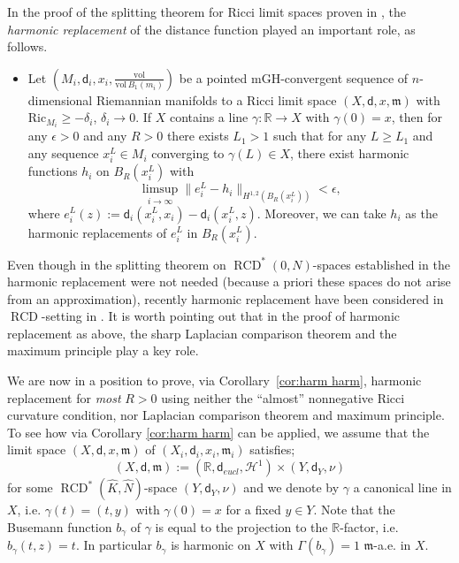 \documentclass[a4paper,11pt,reqno]{article}
\numberwithin{equation}{section}
\theoremstyle{plain}
\theoremstyle{definition}
\theoremstyle{remark}
\newcommand{\dist}{\mathsf{d}}
\newcommand{\meas}{\mathfrak{m}}
\DeclareMathOperator{\RCD}{RCD}
\begin{document}
{\begin{remark}\label{rem:excess}
In the proof of the splitting theorem for Ricci limit spaces proven in \cite{CheegerColding}, the 
\textit{harmonic replacement} of the distance function played an important role, as follows.
\begin{itemize}
\item[] Let $(M_i, \dist_i, x_i,\frac{\mathrm{vol}}{\mathrm{vol}\,B_1(m_i)})$ be a pointed mGH-convergent sequence of $n$-dimensional Riemannian manifolds to a Ricci limit space $(X, \dist,x, \meas)$ with $\mathrm{Ric}_{M_i} \ge -\delta_i$,  $\delta_i \to 0$.
If $X$ contains a line $\gamma: \mathbb{R} \to X$ with $\gamma (0)=x$, then for any $\epsilon>0$ and any $R>0$  there exists 
$L_1>1$ such that for any $L \ge L_1$ and any sequence $x_i^L \in M_i$ converging to $\gamma (L) \in X$,
there exist harmonic functions $h_i$ on $B_R(x^L_i)$ with 
\begin{equation}\label{eq:harm rep ric}
\limsup_{i \to \infty}\|e_i^L-h_i\|_{H^{1, 2}(B_R(x^L_i))}<\epsilon,
\end{equation}
where $e_i^L(z):=\dist_i(x_i^L, x_i)-\dist_i (x_i^L, z)$. Moreover, we can take $h_i$ as the harmonic replacements of $e_i^L$
in $B_R(x_i^L)$.
\end{itemize}

Even though in the splitting theorem on $\RCD^*(0, N)$-spaces established in \cite{Gigli2} the harmonic replacement were not needed
(because a priori these spaces do not arise from an approximation), recently harmonic replacement have been considered in $\RCD$-setting in \cite{HanMondino}. It is worth pointing out that in the proof of harmonic replacement as above, the sharp Laplacian comparison theorem and the 
maximum principle play a key role.

We are now in a position to prove, via Corollary~\ref{cor:harm harm}, harmonic replacement for \textit{most} $R>0$ using neither 
the ``almost'' nonnegative Ricci curvature condition,  nor Laplacian comparison theorem and maximum principle. 
To see how via Corollary \ref{cor:harm harm} can be applied, we assume that the limit space 
$(X, \dist, x,\meas)$ of $(X_i, \dist_i, x_i,\meas_i)$ satisfies;
$$
(X, \dist, \meas) := (\mathbb{R}, \dist_{eucl}, \mathcal{H}^1) \times (Y, \dist_Y, \nu)
$$
for some $\RCD^*(\hat{K}, \hat{N})$-space $ (Y, \dist_Y, \nu)$ and we
denote by $\gamma$ a canonical line in $X$, i.e. $\gamma(t)=(t, y)$ with $\gamma (0)=x$ for a fixed $y \in Y$.
Note that the Busemann function $b_{\gamma}$ of $\gamma$ is equal to the projection to the $\mathbb{R}$-factor, 
i.e. $b_{\gamma}(t, z)=t$. In particular $b_{\gamma}$ is harmonic on $X$ with $\Gamma( b_{\gamma})=1$ $\meas$-a.e. in $X$.


\end{remark}}
\end{document}
